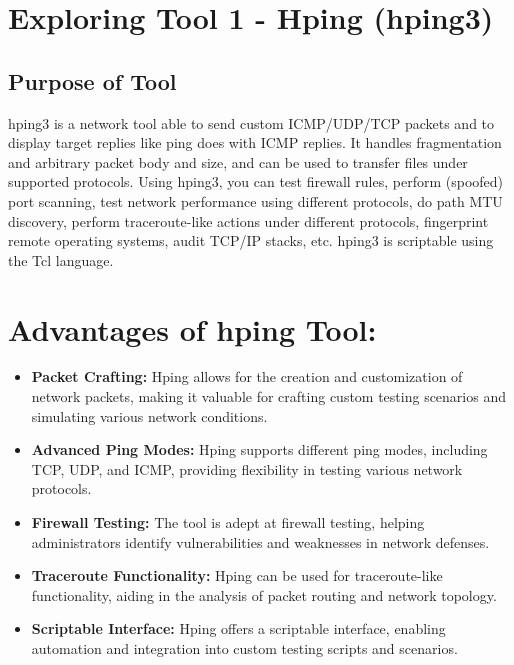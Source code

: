 \documentclass[11pt]{article}
\begin{document}
\tableofcontents
\thispagestyle{empty}
\clearpage

\setcounter{page}{1}

\section{Exploring Tool 1 - Hping (hping3)}

\subsection{Purpose of Tool}
hping3 is a network tool able to send custom ICMP/UDP/TCP packets and to display target replies like ping does with ICMP replies. It handles fragmentation and arbitrary packet body and size, and can be used to transfer files under supported protocols. Using hping3, you can test firewall rules, perform (spoofed) port scanning, test network performance using different protocols, do path MTU discovery, perform traceroute-like actions under different protocols, fingerprint remote operating systems, audit TCP/IP stacks, etc. hping3 is scriptable using the Tcl language.


\section*{Advantages of hping Tool:}
\begin{itemize}
    \item \textbf{Packet Crafting:} Hping allows for the creation and customization of network packets, making it valuable for crafting custom testing scenarios and simulating various network conditions.
    \item \textbf{Advanced Ping Modes:} Hping supports different ping modes, including TCP, UDP, and ICMP, providing flexibility in testing various network protocols.
    \item \textbf{Firewall Testing:} The tool is adept at firewall testing, helping administrators identify vulnerabilities and weaknesses in network defenses.
    \item \textbf{Traceroute Functionality:} Hping can be used for traceroute-like functionality, aiding in the analysis of packet routing and network topology.
    \item \textbf{Scriptable Interface:} Hping offers a scriptable interface, enabling automation and integration into custom testing scripts and scenarios.
\end{itemize}
\end{document}

